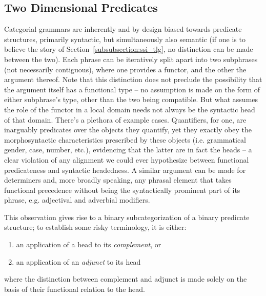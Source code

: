 \subsection{Two Dimensional Predicates}
Categorial grammars are inherently and by design biased towards predicate structures, primarily syntactic, but simultaneously also semantic (if one is to believe the story of Section~\ref{subsubsection:ssi_tlg}, no distinction can be made between the two).
Each phrase can be iteratively split apart into two subphrases (not necessarily contiguous), where one provides a functor, and the other the argument thereof.
Note that this distinction does not preclude the possibility that the argument itself has a functional type -- no assumption is made on the form of either subphrase's type, other than the two being compatible.
But what assumes the role of the functor in a local domain needs not always be the syntactic head of that domain.
There's a plethora of example cases.
Quantifiers, for one, are inarguably predicates over the objects they quantify, yet they exactly obey the morphosyntactic characteristics prescribed by these objects (i.e. grammatical gender, case, number, etc.), evidencing that the latter are in fact the heads -- a clear violation of any alignment we could ever hypothesize between functional predicateness and syntactic headedness.
A similar argument can be made for determiners and, more broadly speaking, any phrasal element that takes functional precedence without being the syntactically prominent part of its phrase, e.g. adjectival and adverbial modifiers.

This observation gives rise to a binary subcategorization of a binary predicate structure; to establish some risky terminology, it is either:
\begin{enumerate}
	\item an application of a head to its \textit{complement}, or
	\item an application of an \textit{adjunct} to its head
\end{enumerate}
where the distinction between complement and adjunct is made solely on the basis of their functional relation to the head.

